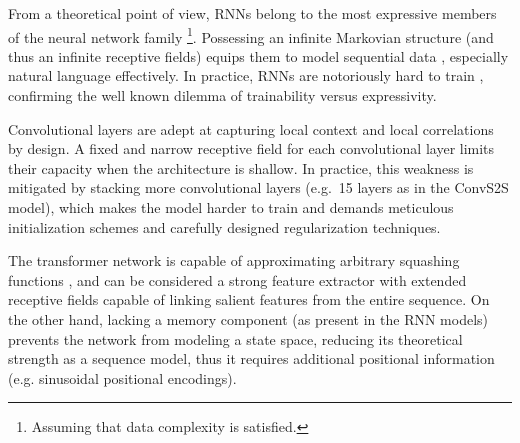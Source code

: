 \documentclass[11pt,a4paper]{article}
\begin{document}
From a theoretical point of view, RNNs belong to the most expressive
members of the neural network family \cite{SIEGELMANN1995132}\footnote{Assuming that data
complexity is satisfied.}. Possessing an infinite Markovian structure (and thus
an infinite receptive fields) equips them to model sequential data \cite{ELMAN1990179},
especially natural language \cite{Grefenstette:2015:LTU:2969442.2969444} effectively.
In practice, RNNs are notoriously hard to train \cite{Bengio:1994:LLD:2325857.2328340},
confirming the well known dilemma of trainability versus expressivity.

Convolutional layers are adept at capturing local context and local
correlations by design. A fixed and narrow receptive field for each
convolutional layer limits their capacity when the architecture is shallow. In
practice, this weakness is mitigated by stacking
more convolutional layers (e.g.~15 layers as in the
ConvS2S model), which makes the model harder to train and
demands meticulous initialization schemes and carefully designed
regularization techniques.


The transformer network is capable of approximating arbitrary squashing
functions \cite{HORNIK1989359}, and can be considered a strong
feature extractor with extended receptive fields capable of linking salient
features from the entire sequence. On the other hand, lacking a memory component
(as present in the RNN models) prevents the network from modeling a state space,
reducing its theoretical strength as a sequence model, thus it requires
additional positional information (e.g. sinusoidal positional encodings).
\end{document}
